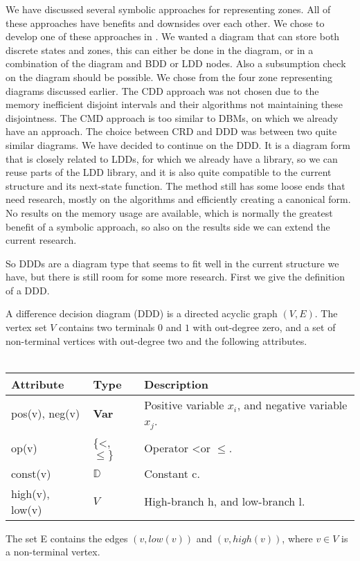 We have discussed several symbolic approaches for representing zones. All of these approaches have benefits and downsides over each other. We chose to develop one of these approaches in \ltsmin{}. We wanted a diagram that can store both discrete states and zones, this can either be done in the diagram, or in a combination of the diagram and BDD or LDD nodes. Also a subsumption check on the diagram should be possible. We chose from the four zone representing diagrams discussed earlier. The CDD approach was not chosen due to the memory inefficient disjoint intervals and their algorithms not maintaining these disjointness. The CMD approach is too similar to DBMs, on which we already have an approach. The choice between CRD and DDD was between two quite similar diagrams. We have decided to continue on the DDD. It is a diagram form that is closely related to LDDs, for which we already have a library, so we can reuse parts of the LDD library, and it is also quite compatible to the current \pins{} structure and its next-state function. The method still has some loose ends that need research, mostly on the algorithms and efficiently creating a canonical form. No results on the memory usage are available, which is normally the greatest benefit of a symbolic approach, so also on the results side we can extend the current research. 

So DDDs are a diagram type that seems to fit well in the current structure we have, but there is still room for some more research. First we give the definition of a DDD.

\begin{mydef}
\label{def:DDD}
A difference decision diagram (DDD) is a directed acyclic graph $(V,E)$. The vertex set $V$ contains two terminals $0$ and $1$ with out-degree zero, and a set of non-terminal vertices with out-degree two and the following attributes.
\\\\
\begin{tabular}{lll}
Attribute                & Type                      & Description                                           \\\hline
pos(v), neg(v)           & \textbf{Var}              & Positive variable $x_i$, and negative variable $x_j$. \\
op(v)                    & \{\textless, $\leq\}$     & Operator \textless or $\leq$.                         \\
const(v)                 & $\mathbb{D}$              & Constant c.                                           \\
high(v), low(v)          & $V$                       & High-branch h, and low-branch l.                   
\end{tabular}
The set E contains the edges $(v,low(v))$ and $(v, high(v))$, where $v \in V$ is a non-terminal vertex.
\end{mydef}


